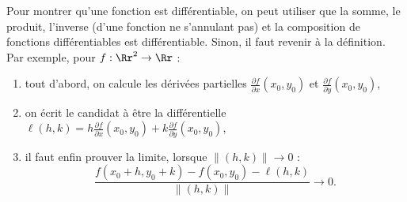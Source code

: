 Pour montrer qu'une fonction est différentiable, on peut utiliser que la somme, le produit, l'inverse (d'une fonction ne s'annulant pas) et la composition de fonctions différentiables est différentiable. Sinon, il faut revenir à la définition. Par exemple, pour $f : \Rr^2 \to \Rr$ : 
\begin{enumerate}
	\item tout d'abord, on calcule les dérivées partielles 
	$\frac{\partial f}{\partial x}(x_0,y_0)$ et  $\frac{\partial f}{\partial y}(x_0,y_0)$, 
	
	\item on écrit le  candidat à être la différentielle $
	\ell(h,k) = 
	h \frac{\partial f}{\partial x}(x_0,y_0) + 
	k \frac{\partial f}{\partial y}(x_0,y_0)
	$,
	
	\item il faut enfin prouver la limite, lorsque $\|(h,k)\| \to 0$ :
	$$\frac{f(x_0+ h,y_0+k) - f(x_0,y_0) - \ell(h,k)}{\|(h,k)\|} \longrightarrow  0.$$
	
\end{enumerate}




